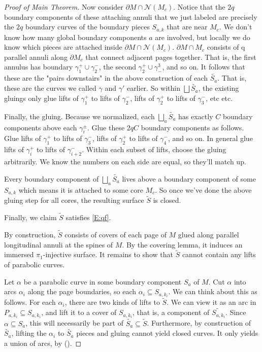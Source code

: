 \documentclass[12pt]{amsart}
\theoremstyle{definition}
\theoremstyle{remark}
\newcommand{\bd}{\partial}
\newcommand{\cin}{\subseteq}
\newcommand{\cN}{\mathcal{N}}
\begin{document}
\begin{proof}[Proof of Main Theorem]
Now consider $\bd M \cap \cN(M_c)$. Notice that the $2q$ boundary components of these
attaching annuli that we just labeled are precisely the $2q$ boundary curves of
the boundary pieces $S_{a,k}$ that are near $M_c$. We don't know how many global
boundary components $a$ are involved, but locally we do know which pieces are
attached inside $\bd M \cap \cN(M_c)$. $\bd M \cap M_c$ consists of q parallel annuli
along $\bd M_c$ that connect adjacent pages together. That is, the first annulus
has boundary $\gamma_1^+ \cup \gamma_2^-$, the second $\gamma_2^+ \cup
\gamma^3_-$, and so on.  It follows that these are the "pairs downstairs" in
the above construction of each $\widetilde{S_a}$. That is, these are the curves
we called $\gamma$ and $\gamma'$ earlier.  So within $\bigsqcup \widetilde{S_a}$,
the existing gluings only glue lifts of $\gamma_1^+$ to lifts of $\gamma_2^-$,
lifts of $\gamma_2^+$ to lifts of $\gamma_3^-$, etc etc.

Finally, the gluing. Because we normalized, each $\bigsqcup_a \widetilde{S_a}$ has
exactly $C$ boundary components above each $\gamma_i^\pm$.  Glue these $2qC$
boundary components as follows. Glue lifts of $\gamma_1^+$ to lifts of
$\gamma_3^-$, lifts of $\gamma_2^+$ to lifts of $\gamma_4^-$, and so on. In
general glue lifts of $\gamma_i^+$ to lifts of $\gamma_{i+2}^-$. Within each
subset of lifts, choose the gluing arbitrarily. We know the numbers on each
side are equal, so they'll match up.

Every boundary component of $\bigsqcup_a \widetilde{S_a}$ lives above a boundary component
of some $S_{a,k}$ which means it is attached to some core $M_c$. So once we've done
the above gluing step for all cores, the resulting surface $\widetilde{S}$ is closed.


Finally, we claim $\widetilde{S}$ satisfies \eqref{E:qf}.


By construction, $\widetilde{S}$ consists of covers of each page of $M$ glued along
parallel longitudinal annuli at the spines of $M$. By the covering lemma, it
induces an immersed $\pi_1$-injective surface. It remains to show that
$\widetilde{S}$ cannot contain any lifts of parabolic curves.

Let $\alpha$ be a parabolic curve in some boundary component $S_a$ of $M$. Cut
$\alpha$ into arcs $\alpha_i$ along the page boundaries, so each $\alpha_i \cin
S_{a,k_i}$.  We can think about this as follows. For each $\alpha_i$, there are two
kinds of lifts to $\widetilde{S}$. We can view it as an arc in $P_{a,k_i} \cin
S_{a,k_i}$, and lift it to a cover of $S_{a,k_i}$, that is, a component of
$\widetilde{S_{a,k_i}}$. Since $\alpha \cin S_a$, this will necessarily be part
of $\widetilde{S_a} \cin \widetilde{S}$. Furthermore, by construction of
$\widetilde{S_a}$, lifting the $\alpha_i$ to $\widetilde{S_a}$ pieces and
gluing cannot yield closed curves.  It only yields a union of arcs, by (\dag).


\end{proof}
\end{document}
